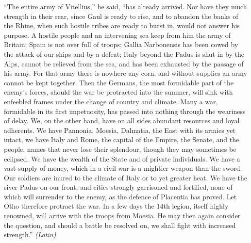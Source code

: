 
``The entire army of Vitellius,'' he said, ``has already arrived. Nor have they much strength in their rear, since Gaul is ready to rise, and to abandon the banks of the Rhine, when such hostile tribes are ready to burst in, would not answer his purpose. A hostile people and an intervening sea keep from him the army of Britain; Spain is not over full of troops; Gallia Narbonensis has been cowed by the attack of our ships and by a defeat; Italy beyond the Padus is shut in by the Alps, cannot be relieved from the sea, and has been exhausted by the passage of his army. For that army there is nowhere any corn, and without supplies an army cannot be kept together. Then the Germans, the most formidable part of the enemy's forces, should the war be protracted into the summer, will sink with enfeebled frames under the change of country and climate. Many a war, formidable in its first impetuosity, has passed into nothing through the weariness of delay. We, on the other hand, have on all sides abundant resources and loyal adherents. We have Pannonia, Moesia, Dalmatia, the East with its armies yet intact, we have Italy and Rome, the capital of the Empire, the Senate, and the people, names that never lose their splendour, though they may sometimes be eclipsed. We have the wealth of the State and of private individuals. We have a vast supply of money, which in a civil war is a mightier weapon than the sword. Our soldiers are inured to the climate of Italy or to yet greater heat. We have the river Padus on our front, and cities strongly garrisoned and fortified, none of which will surrender to the enemy, as the defence of Placentia has proved. Let Otho therefore protract the war. In a few days the 14th legion, itself highly renowned, will arrive with the troops from Moesia. He may then again consider the question, and should a battle be resolved on, we shall fight with increased strength.'' \emph{(Latin)}


